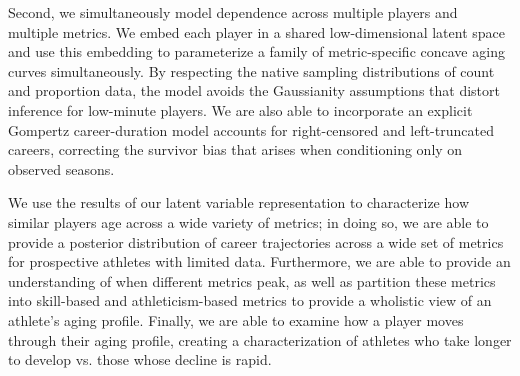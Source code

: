\documentclass[aoas]{imsart}
\begin{document}
Second, we simultaneously model dependence across multiple players and multiple metrics.  We embed each player in a shared low-dimensional latent space and use this embedding to parameterize a family of metric-specific concave aging curves simultaneously.  By respecting the native sampling distributions of count and proportion data, the model avoids the Gaussianity assumptions that distort inference for low-minute players. We are also able to incorporate an explicit Gompertz career-duration model accounts for right-censored and left-truncated careers, correcting the survivor bias that arises when conditioning only on observed seasons.


We use the results of our latent variable representation to characterize how similar players age across a wide variety of metrics; in doing so, we are able to provide a posterior distribution of career trajectories across a wide set of metrics for prospective athletes with limited data. Furthermore, we are able to provide an understanding of when different metrics peak, as well as partition these metrics into skill-based and athleticism-based metrics to provide a wholistic view of an athlete's aging profile. Finally, we are able to examine how a player moves through their aging profile, creating a characterization of athletes who take longer to develop vs. those whose decline is rapid.
\end{document}
